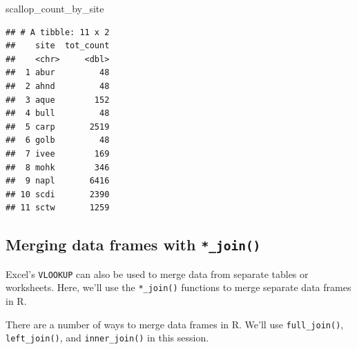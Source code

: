 \documentclass[]{book}
\newenvironment{Shaded}{\begin{snugshade}}{\end{snugshade}}
\newcommand{\CommentTok}[1]{\textcolor[rgb]{0.56,0.35,0.01}{\textit{#1}}}
\newcommand{\DataTypeTok}[1]{\textcolor[rgb]{0.13,0.29,0.53}{#1}}
\newcommand{\KeywordTok}[1]{\textcolor[rgb]{0.13,0.29,0.53}{\textbf{#1}}}
\newcommand{\NormalTok}[1]{#1}
\newcommand{\OperatorTok}[1]{\textcolor[rgb]{0.81,0.36,0.00}{\textbf{#1}}}
\newcommand{\OtherTok}[1]{\textcolor[rgb]{0.56,0.35,0.01}{#1}}
\newcommand{\StringTok}[1]{\textcolor[rgb]{0.31,0.60,0.02}{#1}}
\begin{document}
\begin{Shaded}
\end{Shaded}

\begin{Shaded}
\begin{Highlighting}[]
\NormalTok{scallop_count_by_site}
\end{Highlighting}
\end{Shaded}

\begin{verbatim}
## # A tibble: 11 x 2
##    site  tot_count
##    <chr>     <dbl>
##  1 abur         48
##  2 ahnd         48
##  3 aque        152
##  4 bull         48
##  5 carp       2519
##  6 golb         48
##  7 ivee        169
##  8 mohk        346
##  9 napl       6416
## 10 scdi       2390
## 11 sctw       1259
\end{verbatim}

\hypertarget{merging-data-frames-with-_join}{%
\subsection{\texorpdfstring{Merging data frames with \texttt{*\_join()}}{Merging data frames with *\_join()}}\label{merging-data-frames-with-_join}}

Excel's \texttt{VLOOKUP} can also be used to merge data from separate tables or worksheets. Here, we'll use the \texttt{*\_join()} functions to merge separate data frames in R.

There are a number of ways to merge data frames in R. We'll use \texttt{full\_join()}, \texttt{left\_join()}, and \texttt{inner\_join()} in this session.
\end{document}
